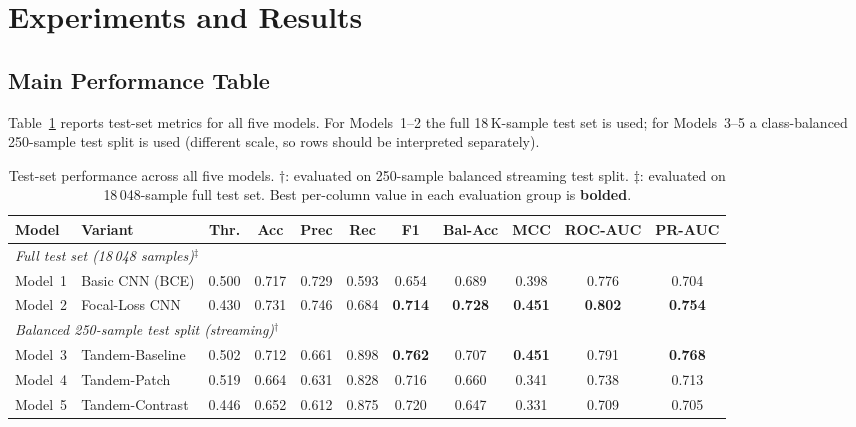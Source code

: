 \documentclass[10pt,twocolumn]{article}
\begin{document}
\section{Experiments and Results}
\label{sec:results}

\subsection{Main Performance Table}

Table~\ref{tab:main_results} reports test-set metrics for all five
models.
For Models~1--2 the full 18\,K-sample test set is used;
for Models~3--5 a class-balanced 250-sample test split is used
(different scale, so rows should be interpreted separately).

\begin{table}[t]
\centering
\caption{Test-set performance across all five models.
$\dagger$: evaluated on 250-sample balanced streaming test split.
$\ddagger$: evaluated on 18\,048-sample full test set.
Best per-column value in each evaluation group is \textbf{bolded}.}
\label{tab:main_results}
\setlength{\tabcolsep}{4pt}
\small
\begin{tabular}{llccccccccc}
\toprule
\textbf{Model} & \textbf{Variant} & \textbf{Thr.} &
\textbf{Acc} & \textbf{Prec} & \textbf{Rec} &
\textbf{F1} & \textbf{Bal-Acc} & \textbf{MCC} &
\textbf{ROC-AUC} & \textbf{PR-AUC} \\
\midrule
\multicolumn{11}{l}{\textit{Full test set (18\,048 samples)$^\ddagger$}} \\
Model~1 & Basic CNN (BCE) & 0.500 & 0.717 & 0.729 & 0.593 & 0.654 & 0.689 & 0.398 & 0.776 & 0.704 \\
Model~2 & Focal-Loss CNN  & 0.430 & 0.731 & 0.746 & 0.684 & \textbf{0.714} & \textbf{0.728} & \textbf{0.451} & \textbf{0.802} & \textbf{0.754} \\
\midrule
\multicolumn{11}{l}{\textit{Balanced 250-sample test split (streaming)$^\dagger$}} \\
Model~3 & Tandem-Baseline   & 0.502 & 0.712 & 0.661 & 0.898 & \textbf{0.762} & 0.707 & \textbf{0.451} & 0.791 & \textbf{0.768} \\
Model~4 & Tandem-Patch      & 0.519 & 0.664 & 0.631 & 0.828 & 0.716 & 0.660 & 0.341 & 0.738 & 0.713 \\
Model~5 & Tandem-Contrast   & 0.446 & 0.652 & 0.612 & 0.875 & 0.720 & 0.647 & 0.331 & 0.709 & 0.705 \\
\bottomrule
\end{tabular}
\end{table}
\end{document}
